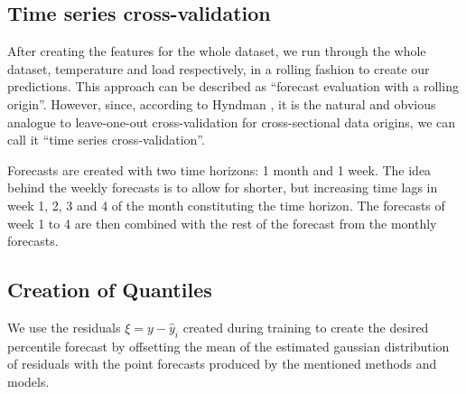 \documentclass[conference]{IEEEtran}
\begin{document}

\subsection{Time series cross-validation}
After creating the features for the whole dataset, we run through the whole dataset, temperature and load respectively, in a rolling fashion to create our predictions. This approach can be described as ``forecast evaluation with a rolling origin''. However, since, according to Hyndman \cite{Rob}, it is the natural and obvious analogue to leave-one-out cross-validation for cross-sectional data origins, we can call it ``time series cross-validation''.\par
Forecasts are created with two time horizons: 1 month and 1 week. The idea behind the weekly forecasts is to allow for shorter, but increasing time lags in week 1, 2, 3 and 4 of the month constituting the time horizon. The forecasts of week 1 to 4 are then combined with the rest of the forecast from the monthly forecasts.

\subsection{Creation of Quantiles}
We use the residuals $\xi=y-\hat{y}_i$ created during training to create the desired percentile forecast by offsetting the mean of the estimated gaussian distribution of residuals with the point forecasts produced by the mentioned methods and models.
\end{document}
